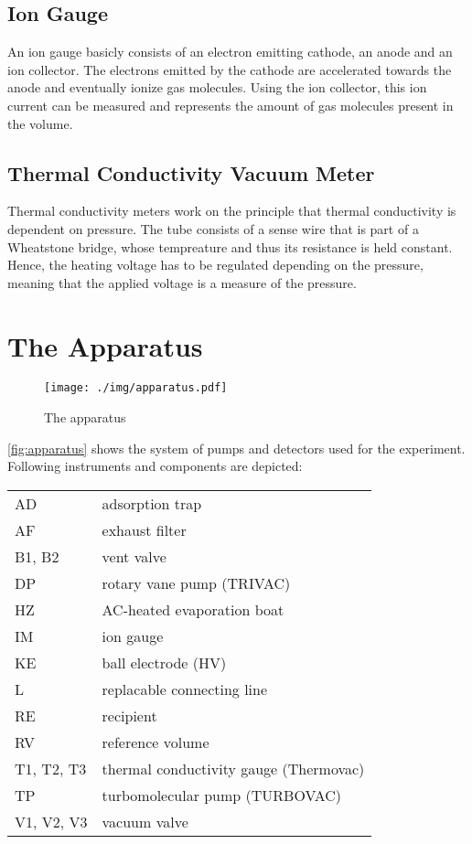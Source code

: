 \subsection{Ion Gauge}
An ion gauge basicly consists of an electron emitting cathode, an anode and an ion collector.
The electrons emitted by the cathode are accelerated towards the anode and eventually ionize gas molecules.
Using the ion collector, this ion current can be measured and represents the amount of gas molecules present in the volume.

\subsection{Thermal Conductivity Vacuum Meter}
Thermal conductivity meters work on the principle that thermal conductivity is dependent on pressure.
The tube consists of a sense wire that is part of a Wheatstone bridge, whose tempreature and thus its resistance is held constant.
Hence, the heating voltage has to be regulated depending on the pressure, meaning that the applied voltage is a measure of the pressure.

\section{The Apparatus}
\begin{figure}[tbp]
	\centering
	\texttt{[image: ./img/apparatus.pdf]}
	\caption[The apparatus]{The apparatus}
	\label{fig:apparatus}
\end{figure}
\autoref{fig:apparatus} shows the system of pumps and detectors used for the experiment. Following instruments and components are depicted:
\begin{table}[h!]
	\centering
	\begin{tabular}{ll}
		AD & adsorption trap	\\
		AF & exhaust filter	\\
		B1, B2 & vent valve\\
		DP & rotary vane pump (TRIVAC)	\\
		HZ & AC-heated evaporation boat	\\
		IM & ion gauge	\\
		KE & ball electrode (HV)	\\
		L & replacable connecting line	\\
		RE & recipient	\\
		RV & reference volume	\\
		T1, T2, T3 & thermal conductivity gauge (Thermovac)	\\
		TP & turbomolecular pump (TURBOVAC)	\\
		V1, V2, V3 & vacuum valve	\\
	\end{tabular}
\end{table}

